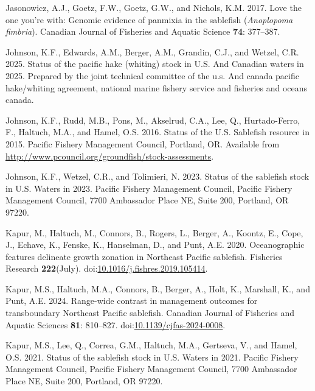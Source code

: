 \documentclass[
  english,
]{article}
\newlength{\cslhangindent}
\newenvironment{CSLReferences}[2] %
 {\begin{list}{}{%
  \setlength{\itemindent}{0pt}
  \setlength{\leftmargin}{0pt}
  \setlength{\parsep}{0pt}
  \ifodd #1
   \setlength{\leftmargin}{\cslhangindent}
   \setlength{\itemindent}{-1\cslhangindent}
  \fi
  \setlength{\itemsep}{#2\baselineskip}}}
 {\end{list}}
\begin{document}
\begin{CSLReferences}{1}{0}
Jasonowicz, A.J., Goetz, F.W., Goetz, G.W., and Nichols, K.M. 2017. Love
the one you're with: Genomic evidence of panmixia in the sablefish
(\emph{{A}noplopoma fimbria}). Canadian Journal of Fisheries and Aquatic
Science \textbf{74}: 377--387.

Johnson, K.F., Edwards, A.M., Berger, A.M., Grandin, C.J., and Wetzel,
C.R. 2025. Status of the pacific hake (whiting) stock in {U}.{S}. And
{C}anadian waters in 2025. Prepared by the joint technical committee of
the u.s. And canada pacific hake/whiting agreement, national marine
fishery service and fisheries and oceans canada.

Johnson, K.F., Rudd, M.B., Pons, M., Akselrud, C.A., Lee, Q.,
Hurtado-Ferro, F., Haltuch, M.A., and Hamel, O.S. 2016. Status of the
{U}.{S}. Sablefish resource in 2015. Pacific Fishery Management Council,
Portland, OR. Available from
\url{http://www.pcouncil.org/groundfish/stock-assessments}.

Johnson, K.F., Wetzel, C.R., and Tolimieri, N. 2023. Status of the
sablefish stock in {U.S.} Waters in 2023. Pacific Fishery Management
Council, Pacific Fishery Management Council, 7700 Ambassador Place NE,
Suite 200, Portland, OR 97220.

Kapur, M., Haltuch, M., Connors, B., Rogers, L., Berger, A., Koontz, E.,
Cope, J., Echave, K., Fenske, K., Hanselman, D., and Punt, A.E. 2020.
{Oceanographic features delineate growth zonation in Northeast Pacific
sablefish}. Fisheries Research \textbf{222}(July).
doi:\href{https://doi.org/10.1016/j.fishres.2019.105414}{10.1016/j.fishres.2019.105414}.

Kapur, M.S., Haltuch, M.A., Connors, B., Berger, A., Holt, K., Marshall,
K., and Punt, A.E. 2024. Range-wide contrast in management outcomes for
transboundary {N}ortheast {P}acific sablefish. Canadian Journal of
Fisheries and Aquatic Sciences \textbf{81}: 810--827.
doi:\href{https://doi.org/10.1139/cjfas-2024-0008}{10.1139/cjfas-2024-0008}.

Kapur, M.S., Lee, Q., Correa, G.M., Haltuch, M.A., Gertseva, V., and
Hamel, O.S. 2021. Status of the sablefish stock in {U.S.} Waters in
2021. Pacific Fishery Management Council, Pacific Fishery Management
Council, 7700 Ambassador Place NE, Suite 200, Portland, OR 97220.


\end{CSLReferences}
\end{document}

